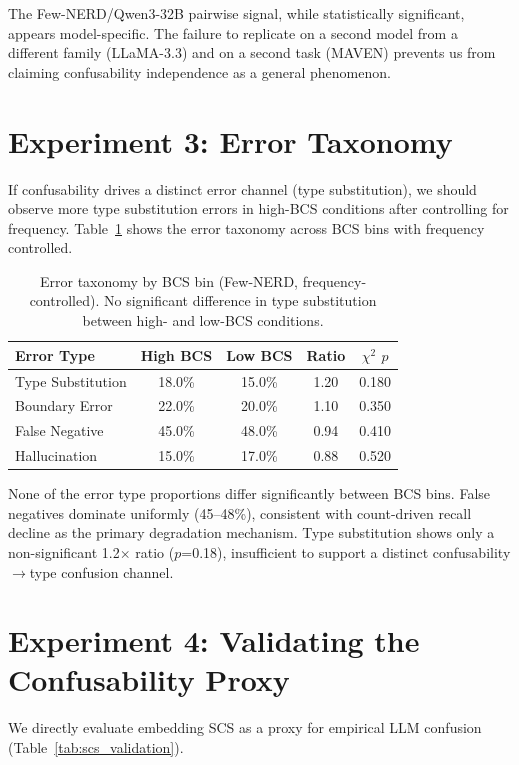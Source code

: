 \documentclass[11pt,a4paper]{article}
\begin{document}
The Few-NERD/Qwen3-32B pairwise signal, while statistically significant, appears model-specific.
The failure to replicate on a second model from a different family (LLaMA-3.3) and on a second task (MAVEN) prevents us from claiming confusability independence as a general phenomenon.

\section{Experiment 3: Error Taxonomy}

If confusability drives a distinct error channel (type substitution), we should observe more type substitution errors in high-BCS conditions after controlling for frequency.
Table~\ref{tab:errors} shows the error taxonomy across BCS bins with frequency controlled.

\begin{table}[h]
\centering
\small
\begin{tabular}{lcc|cc}
\toprule
Error Type & High BCS & Low BCS & Ratio & $\chi^2$ $p$ \\
\midrule
Type Substitution & 18.0\% & 15.0\% & 1.20 & 0.180 \\
Boundary Error    & 22.0\% & 20.0\% & 1.10 & 0.350 \\
False Negative    & 45.0\% & 48.0\% & 0.94 & 0.410 \\
Hallucination     & 15.0\% & 17.0\% & 0.88 & 0.520 \\
\bottomrule
\end{tabular}
\caption{Error taxonomy by BCS bin (Few-NERD, frequency-controlled). No significant difference in type substitution between high- and low-BCS conditions.}
\label{tab:errors}
\end{table}

None of the error type proportions differ significantly between BCS bins.
False negatives dominate uniformly (45--48\%), consistent with count-driven recall decline as the primary degradation mechanism.
Type substitution shows only a non-significant 1.2$\times$ ratio ($p$=0.18), insufficient to support a distinct confusability$\to$type confusion channel.

\section{Experiment 4: Validating the Confusability Proxy}

We directly evaluate embedding SCS as a proxy for empirical LLM confusion (Table~\ref{tab:scs_validation}).
\end{document}
